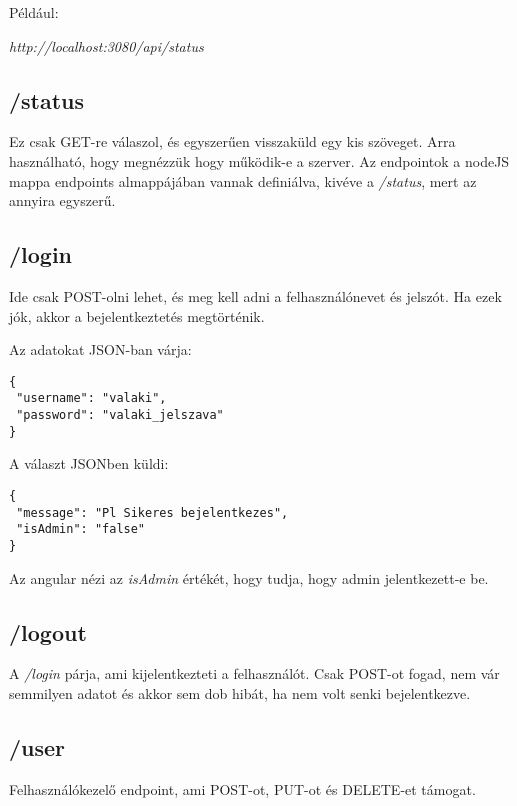 \documentclass[]{article}
\begin{document}
Például:

\bigskip
\begin{center}
	\textit{http://localhost:3080/api/status}
\end{center}

\subsection{/status}

Ez csak GET-re válaszol, és egyszerűen visszaküld egy kis szöveget. Arra használható, hogy megnézzük hogy működik-e a szerver. Az endpointok a nodeJS mappa endpoints almappájában vannak definiálva, kivéve a \textit{/status}, mert az annyira egyszerű.

\subsection{/login}

Ide csak POST-olni lehet, és meg kell adni a felhasználónevet és jelszót. Ha ezek jók, akkor a bejelentkeztetés megtörténik.

\noindent
Az adatokat JSON-ban várja:

\bigskip
\begin{lstlisting}
{
 "username": "valaki",
 "password": "valaki_jelszava"
}
\end{lstlisting}

\noindent
A választ JSONben küldi:

\bigskip
\begin{lstlisting}
{
 "message": "Pl Sikeres bejelentkezes",
 "isAdmin": "false"
}
\end{lstlisting}

\noindent
Az angular nézi az \textit{isAdmin} értékét, hogy tudja, hogy admin jelentkezett-e be.

\subsection{/logout}

A \textit{/login} párja, ami kijelentkezteti a felhasználót. Csak POST-ot fogad, nem vár semmilyen adatot és akkor sem dob hibát, ha nem volt senki bejelentkezve.

\subsection{/user}

Felhasználókezelő endpoint, ami POST-ot, PUT-ot és DELETE-et támogat.
\end{document}

